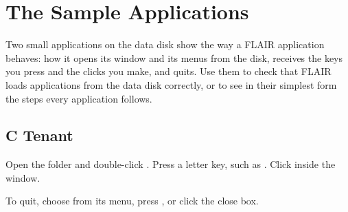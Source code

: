 \chapter{The Sample Applications}
\label{ch:samples}

Two small applications on the data disk show the way a FLAIR application
behaves: how it opens its window and its menus from the disk, receives the
keys you press and the clicks you make, and quits.  Use them to check that
FLAIR loads applications from the data disk correctly, or to see in their
simplest form the steps every application follows.

\section{C Tenant}
\begin{TaskSteps}
\Step Open the  folder and double-click .
\Step Press a letter key, such as .
\Step Click inside the window.
\end{TaskSteps}


To quit, choose  from its  menu, press
, or click the close box.

